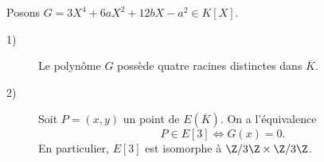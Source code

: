 
\begin{lemme}
    Posons $G=3X^{4}+6aX^2+12bX-a^2 \in K[X]$.
    \begin{description}
        \item[1)] Le polynôme $G$ possède quatre racines distinctes dans $\overline{K}$.
        \item[2)] Soit $P=\left( x,y \right) $ un point de $E(\overline{K})$. On a l'équivalence
            \[
            P \in E[3] \iff G(x)=0
            .\] 
            En particulier, $E[3]$ est isomorphe à $\Z /3\Z \times \Z /3\Z$.
    \end{description}
\end{lemme}

\begin{demonstration}
    
\end{demonstration}
